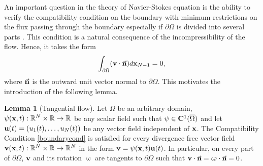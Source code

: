 \documentclass[a4 paper, 11pt,twoside]{article}
\newcommand{\Bf}[1]{{\bf{#1}}}
\newcommand{\V}{{\bf{v}}}
\newcommand{\X}{{\bf{x}}}
\newcommand{\U}{{\bf{u}}}
\newcommand{\0}{\Bf{0}}
\theoremstyle{definition}
\newtheorem{lemma}[theorem]{Lemma}
\begin{document}
An important question in the theory of Navier-Stokes equation is the ability to verify the compatibility condition on the boundary with minimum restrictions on the flux passing through the boundary especially if $\partial\Omega$ is divided into several parts \cite[pp. 4-8]{galdi}. This condition is a natural consequence of the incompressibility of the flow. Hence, it takes the form
\begin{equation}
\int_{\partial\Omega}(\Bf{v}\cdot\vec{\Bf{n}})d\X_{N-1}=0,
\label{boundarycond}
\end{equation}
where $\vec{\Bf{n}}$ is the outward unit vector normal to $\partial\Omega$. This motivates the introduction of the following lemma.
\begin{lemma}[Tangential flow]
Let $\Omega$ be an arbitrary domain, $\psi(\X,t):\mathbb{R}^N\times\mathbb{R}\rightarrow\mathbb{R}$ be any scalar field such that $\psi\in\Bf{C}^1(\overline{\Omega})$ and let $\U(t)=(u_1(t),\dots,u_N(t))$ be any vector field independent of $\X$. The Compatibility Condition \eqref{boundarycond} is satisfied for every divergence free vector field $\V(\X,t):\mathbb{R}^N\times\mathbb{R}\rightarrow\mathbb{R}^N$ in the form $\V=\psi(\X,t)\U(t)$. In particular, on every part of $\partial\Omega$, $\V$ and its rotation $\upomega$ are tangents to $\partial\Omega$ such that $\V\cdot\vec{\Bf{n}}=\upomega\cdot\vec{\Bf{n}}=0$.
\label{compcond}
\end{lemma}
\end{document}
